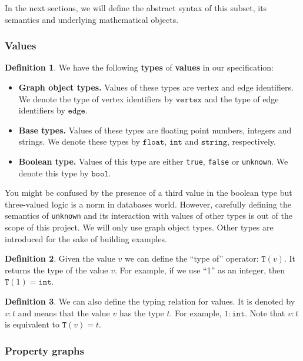 \documentclass[14pt]{constructor-thesis}
\theoremstyle{definition}
\newtheorem{definition}{Definition}
\begin{document}
In the next sections, we will define the abstract syntax of this subset, its semantics and underlying mathematical objects.

\subsubsection{Values}
\label{sec:GQL-values}

\begin{definition}
  We have the following \textbf{types} of \textbf{values} in our specification:
  \begin{itemize}
    \item \textbf{Graph object types.} Values of these types are vertex and edge identifiers. We denote the type of vertex identifiers by $\mathtt{vertex}$ and the type of edge identifiers by $\mathtt{edge}$.
    \item \textbf{Base types.} Values of these types are floating point numbers, integers and strings. We denote these types by $\mathtt{float}$, $\mathtt{int}$ and $\mathtt{string}$, respectively.
    \item \textbf{Boolean type.} Values of this type are either \texttt{true}, \texttt{false} or \texttt{unknown}. We denote this type by $\mathtt{bool}$.
  \end{itemize}
\end{definition}

You might be confused by the presence of a third value in the boolean type but three-valued logic is a norm in databases world. However, carefully defining the semantics of \texttt{unknown} and its interaction with values of other types is out of the scope of this project. We will only use graph object types. Other types are introduced for the sake of building examples.

\begin{definition}
  Given the value $v$ we can define the ``type of'' operator: $\mathtt{T}(v)$. It returns the type of the value $v$. For example, if we use ``1'' as an integer, then $\mathtt{T}(1) = \mathtt{int}$.
\end{definition}

\begin{definition}
  We can also define the typing relation for values. It is denoted by $v : t$ and means that the value $v$ has the type $t$. For example, $1 : \mathtt{int}$. Note that $v : t$ is equivalent to $\mathtt{T}(v) = t$.
\end{definition}

\subsubsection{Property graphs}
\end{document}
